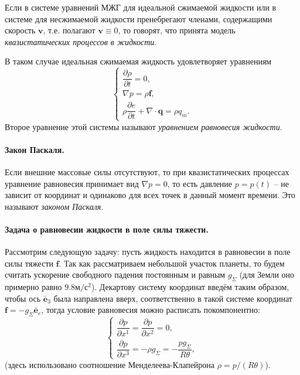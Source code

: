 
\begin{definition}
  Если в системе уравнений МЖГ для идеальной сжимаемой жидкости или в системе для несжимаемой
  жидкости пренебрегают членами, содержащими скорость $\mathbf{v}$, т.е. полагают
  $\mathbf{v} \equiv 0$, то говорят, что принята модель \emph{квазистатических процессов в
  жидкости}.
\end{definition}

В таком случае идеальная сжимаемая жидкость удовлетворяет уравнениям
\[
  \begin{cases}
    \dfrac{\partial \rho}{\partial t} = 0, \\
    \nabla p = \rho \mathbf{f}, \\
    \rho \dfrac{\partial e}{\partial t} + \nabla \cdot \mathbf{q} = \rho q_m.
  \end{cases}
\]
Второе уравнение этой системы называют \emph{уравнением равновесия жидкости}.

\paragraph{Закон Паскаля.} Если внешние массовые силы отсутствуют, то при квазистатических
процессах уравнение равновесия принимает вид $\nabla p = 0$, то есть давление $p = p(t)$ --
не зависит от координат и одинаково для всех точек в данный момент времени.
Это называют \emph{законом Паскаля}.

\paragraph{Задача о равновесии жидкости в поле силы тяжести.} 
Рассмотрим следующую задачу: пусть жидкость находится в равновесии в поле силы тяжести
$\mathbf{f}$.
Так как рассматриваем небольшой участок планеты, то будем считать ускорение свободного падения
постоянным и равным $g_\Sigma$ (для Земли оно примерно равно $9.8 \text{м}/\text{с}^2$). 
Декартову систему координат введём таким образом, чтобы ось $\bar{\mathbf{e}}_3$ была направлена
вверх, соответственно в такой системе координат $\mathbf{f} = - g_\Sigma \bar{\mathbf{e}}_e$,
тогда условие равновесия можно расписать покомпонентно:
\[
  \begin{cases}
    \dfrac{\partial p}{\partial x^1} = \dfrac{\partial p}{\partial x^2} = 0, \\
    \dfrac{\partial p}{\partial x^3} = - \rho g_\Sigma = - \dfrac{p g_\Sigma}{R\theta},
  \end{cases}
\]
(здесь использовано соотношение Менделеева-Клапейрона $\rho = p/(R\theta)$).


